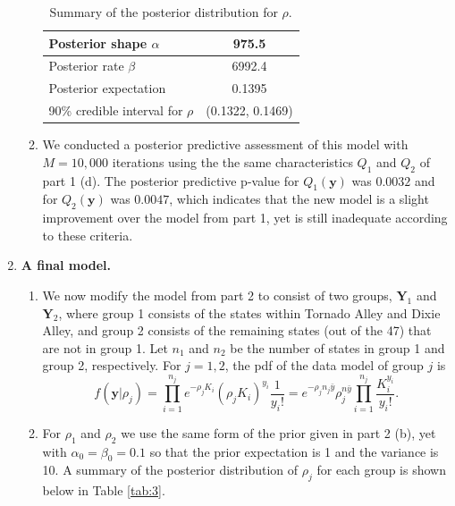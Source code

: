 \documentclass[12pt]{article}
\begin{document}
\begin{enumerate}[leftmargin=*]
\begin{enumerate}[leftmargin=1mm]
        \begin{table}[h!]
          \centering
          \begin{tabular}{lc}
            \hline
            Posterior shape $\alpha$ & 975.5 \\
            \hline
            Posterior rate $\beta$ & 6992.4  \\
            \hline
            Posterior expectation & 0.1395 \\
            \hline
            90\% credible interval for $\rho$ & (0.1322, 0.1469) \\
            \hline
          \end{tabular}
          \caption{Summary of the posterior distribution for $\rho$.}
          \label{tab:2}
        \end{table}

      \item We conducted a posterior predictive assessment of this model with $M = 10,000$ iterations 
        using the the same characteristics $Q_1$ and $Q_2$ of part 1 (d). The posterior predictive p-value for
        $Q_1(\bm{y})$ was $0.0032$ and for $Q_2(\bm{y})$ was $0.0047$, which indicates that the new model is a slight improvement over the model from
        part 1, yet is still inadequate according to these criteria.

    \end{enumerate}

  \item \textbf{A final model.}

    \begin{enumerate}[leftmargin=1mm]
      \item We now modify the model from part 2 to consist of two groups, $\bm{Y}_1$ and $\bm{Y}_2$, where group 1 consists of the states
        within Tornado Alley and Dixie Alley, and group 2 consists of the remaining states (out of the 47) that are not in group 1.
        Let $n_1$ and $n_2$ be the number of states in group 1 and group 2, respectively. For $j = 1,2$, the pdf of the data model of group $j$ is 
        \[
          f(\bm{y}|\rho_j) = \prod_{i=1}^{n_j} e^{-\rho_j K_i}(\rho_j K_i)^{y_i} \frac{1}{y_i!} = e^{-\rho_j n_j\bar{y}}\rho_j^{n\bar{y}}
          \prod_{i=1}^{n_j}\frac{K_i^{y_i}}{y_i!}.
        \]

      \item For $\rho_1$ and $\rho_2$ we use the same form of the prior given in part 2 (b), yet with $\alpha_0 = \beta_0 = 0.1$ so that the prior
        expectation is 1 and the variance is 10. A summary of the posterior distribution of $\rho_j$ for each group is shown below in Table
        \ref{tab:3}.


\end{enumerate}
\end{enumerate}
\end{document}
